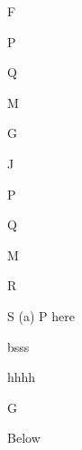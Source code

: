 \documentclass[12pt]{article}
\begin{document}
\begin{enumext}[columns=2,nosep,parsep=0pt,itemsep=0pt]
\item F

  \begin{enumext}[nosep,topsep=10pt]
     \item P \item Q \item M
  \end{enumext}
\item G

\columnbreak

\item J

  \begin{enumext}[columns=2,mini-env={0.4\linewidth},nosep,topsep=10pt]
    \item P \item Q \item M \columnbreak \item R \item S
    \miniright
    (a) P here \par bsss \par hhhh %
  \end{enumext}

\item G
\end{enumext}
Below
\end{document}
